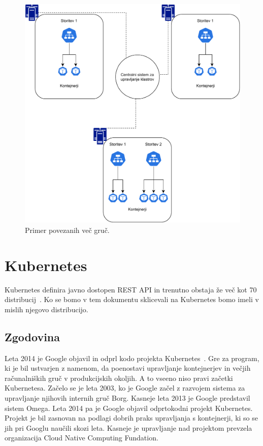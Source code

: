 \documentclass[a4paper, 12pt]{book}
\begin{document}
\begin{figure}[h]
\begin{center}
\includegraphics[width=1.0\textwidth]{images/primer-povezanih-gruc.pdf}
\end{center}
\caption{Primer povezanih več gruč.}
\label{problem-povezanih-gruc}
\end{figure}

\chapter{Kubernetes}
\label{Kubernetes}
Kubernetes definira javno dostopen REST API in trenutno obstaja že več kot 70 distribucij~\cite{cncf}.
Ko se bomo v tem dokumentu sklicevali na Kubernetes bomo imeli v mislih njegovo distribucijo.
\section{Zgodovina}
Leta 2014 je Google objavil in odprl kodo projekta Kubernetes~\cite{what-is-Kubernetes}.
Gre za program, ki je bil ustvarjen z namenom, da poenostavi upravljanje kontejnerjev in večjih računalniških gruč v produkcijskih okoljih.
A to vseeno niso pravi začetki Kubernetesa.
Začelo se je leta 2003, ko je Google začel z razvojem sistema za upravljanje njihovih internih gruč Borg.
Kasneje leta 2013 je Google predstavil sistem Omega.
Leta 2014 pa je Google objavil odprtokodni projekt Kubernetes. 
Projekt je bil zasnovan na podlagi dobrih praks upravljanja s kontejnerji, ki so se jih pri Googlu naučili skozi leta.
Kasneje je upravljanje nad projektom prevzela organizacija Cloud Native Computing Fundation.
\end{document}
